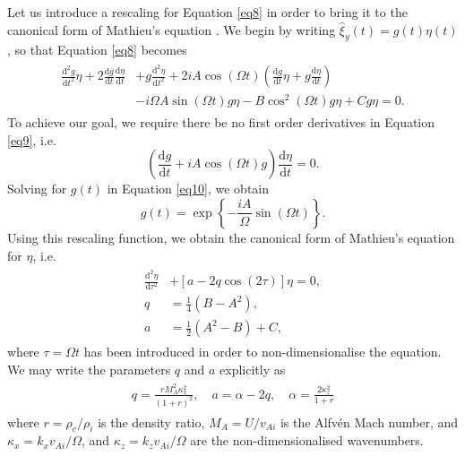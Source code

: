 \documentclass[12pt]{ociamthesis}
\begin{document}
Let us introduce a rescaling for Equation \eqref{eq8} in order to bring it to the canonical form of Mathieu's equation \citep{McLachlan1946}.
We begin by writing $\hat \xi_y (t) = g(t) \eta(t)$, so that Equation \eqref{eq8} becomes
\begin{align}
\begin{split}
\label{eq9}
\frac{\mathrm{d}^2 g}{\mathrm{d} t^2} \eta
+ 2 \frac{\mathrm{d} g}{\mathrm{d} t} \frac{\mathrm{d} \eta}{\mathrm{d} t}
& + g \frac{\mathrm{d}^2 \eta}{\mathrm{d} t^2}
+ 2 i A \cos(\Omega t) ( \frac{\mathrm{d} g}{\mathrm{d} t} \eta
+ g \frac{\mathrm{d} \eta}{\mathrm{d} t})
\\[0.3cm]
& - i \Omega A \sin(\Omega t) g \eta 
- B \cos^2(\Omega t) g \eta
+ C g \eta
= 0.
\end{split}
\end{align}
To achieve our goal, we require there be no first order derivatives in Equation \eqref{eq9}, i.e.
\begin{equation}
\label{eq10}
\left( \frac{\mathrm{d} g}{\mathrm{d} t}
+ i A \cos(\Omega t) g \right) \frac{\mathrm{d} \eta}{\mathrm{d} t}
= 0.
\end{equation}
Solving for $g(t)$ in Equation \eqref{eq10}, we obtain
\begin{equation}
\label{eq11}
g(t) = \exp\left\{- \frac{i A}{\Omega} \sin(\Omega t)\right\}.
\end{equation}
Using this rescaling function, we obtain the canonical form of Mathieu's equation for $\eta$, i.e.
\begin{align}
\begin{split}
\label{eq12}
\frac{\mathrm{d}^2 \eta}{\mathrm{d} \tau^2}
& + [a - 2 q \cos(2 \tau)] \eta = 0,
\\[0.3cm]
q & = \frac{1}{4} (B - A^2),
\\[0.3cm]
a & = \frac{1}{2} (A^2 - B) + C,
\end{split}
\end{align}
where $\tau = \Omega t$ has been introduced in order to non-dimensionalise the equation.
We may write the parameters $q$ and $a$ explicitly as
\begin{align}
\begin{split}
\label{eq13}
q = \frac{r M_A^2 \kappa_x^2}{(1 + r)^2}, \quad
a = \alpha - 2 q, \quad
\alpha = \frac{2 \kappa_z^2}{1 + r}
\end{split}
\end{align}
where $r = \rho_e / \rho_i$ is the density ratio, $M_A = U / v_{Ai}$ is the Alfv\'en Mach number, and $\kappa_x = k_x v_{Ai} / \Omega$, and $\kappa_z = k_z v_{Ai} /\Omega$ are the non-dimensionalised wavenumbers.
\end{document}
